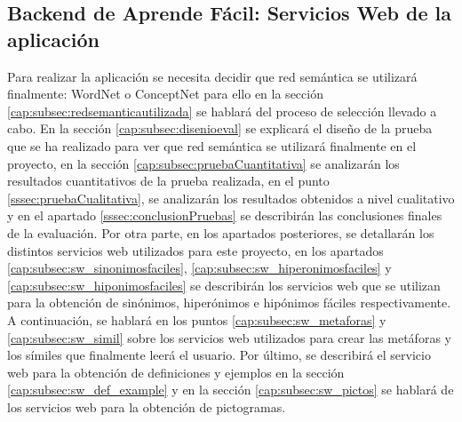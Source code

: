 \subsection{Backend de Aprende Fácil: Servicios Web de la aplicación}
\label{cap:subsec:backendapp}
Para realizar la aplicación se necesita decidir que red semántica se utilizará finalmente: WordNet o ConceptNet para ello en la sección \ref{cap:subsec:redsemanticautilizada} se hablará del proceso de selección llevado a cabo. En la sección \ref{cap:subsec:disenioeval} se explicará el diseño de la prueba que se ha realizado para ver que red semántica se utilizará finalmente en el proyecto, en la sección \ref{cap:subsec:pruebaCuantitativa} se analizarán los resultados cuantitativos de la prueba realizada, en el punto \ref{sssec:pruebaCualitativa}, se analizarán los resultados obtenidos a nivel cualitativo y en el apartado \ref{sssec:conclusionPruebas} se describirán las conclusiones finales de la evaluación. Por otra parte, en los apartados posteriores, se detallarán los distintos servicios web utilizados para este proyecto, en los apartados \ref{cap:subsec:sw_sinonimosfaciles}, \ref{cap:subsec:sw_hiperonimosfaciles} y \ref{cap:subsec:sw_hiponimosfaciles} se describirán los servicios web que se utilizan para la obtención de sinónimos, hiperónimos e hipónimos fáciles respectivamente. A continuación, se hablará en los puntos \ref{cap:subsec:sw_metaforas} y \ref{cap:subsec:sw_simil} sobre los servicios web utilizados para crear las metáforas y los símiles que finalmente leerá el usuario. Por último, se describirá el servicio web para la obtención de definiciones y ejemplos en la sección \ref{cap:subsec:sw_def_example} y en la sección \ref{cap:subsec:sw_pictos} se hablará de los servicios web para la obtención de pictogramas.



 


